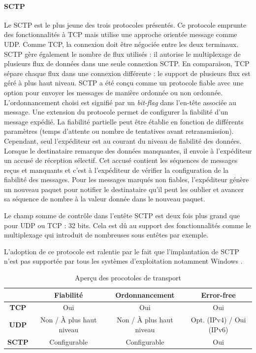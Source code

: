 \paragraph{SCTP}
Le \gls{SCTP} est le plus jeune des trois protocoles présentés. Ce protocole 
emprunte des fonctionnalités à \gls{TCP} mais utilise une approche orientée 
message comme \gls{UDP}. Comme \gls{TCP}, la connexion doit être négociée 
entre les deux terminaux. \gls{SCTP} gère également le nombre de flux utilisés 
: il autorise le multiplexage de plusieurs flux de données dans une seule 
connexion \gls{SCTP}. En comparaison, \gls{TCP} sépare chaque flux dans une 
connexion différente : le support de plusieurs flux est géré à plus haut niveau.
\gls{SCTP} a été conçu comme un protocole fiable avec une option pour envoyer 
les messages de manière ordonnée ou non ordonnée. L'ordonnancement choisi est 
signifié par un \textit{bit-flag} dans l'en-tête associée au message. Une extension 
du protocole permet de configurer la fiabilité d'un message expédié. La fiabilité 
partielle peut être établie en fonction de différents paramètres (temps d'attente ou 
nombre de tentatives 
avant retransmission). Cependant, seul l'expéditeur est au courant du niveau de 
fiabilité des données. Lorsque le destinataire remarque des données manquantes, 
il envoie à l'expéditeur un accusé de réception sélectif. Cet accusé contient 
les séquences de messages reçus et manquants et c'est à l'expéditeur de vérifier 
la configuration de la fiabilité des messages. Pour les messages marqués non 
fiables, l'expéditeur génère un nouveau paquet pour notifier le destinataire qu'il 
peut les \og oublier\fg{} et avancer sa séquence de nombre à la valeur donnée 
dans le nouveau paquet. 

Le champ somme de contrôle dans l'entête \gls{SCTP} est deux fois plus 
grand que pour \gls{UDP} ou \gls{TCP} : 32 bits. Cela est dû au support des 
fonctionnalités comme le multiplexage qui introduit de nombreuses sous entêtes 
par exemple.

L'adoption de ce protocole est ralentie par le fait que l'implantation de \gls{SCTP} 
n'est pas supportée par tous les systèmes d'exploitation notamment 
Windows \cite{Hogg}. 

\begin{table}[h]
	\caption{Aperçu des procotoles de transport}
	\noindent\small
	\begin{tabular}{cccc}
		& \textbf{Fiabilité} & \textbf{Ordonnancement} & \textbf{Error-free} \\ 
		\hline 
		\textbf{TCP} & Oui & Oui & Oui \\ 
		\hline 
		\textbf{UDP} & Non / À plus haut niveau & Non / À plus 
		haut 
		niveau & Opt. 
		(IPv4) / 
		Oui (IPv6) \\ 
		\hline 
		\textbf{SCTP} & Configurable & Configurable &  Oui \\ 
		\hline
	\end{tabular} 
\end{table}

